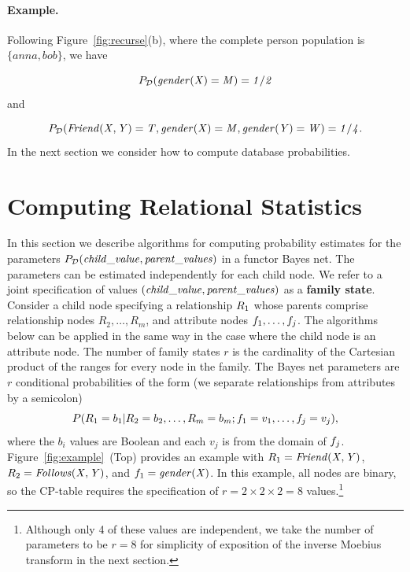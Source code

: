 \documentclass[oribibl]{llncs}
\begin{document}
\paragraph{Example.} Following Figure~\ref{fig:recurse}(b), where the complete person population is $\{anna,bob\}$, we have 

$$P_{\mathcal{D}}(\it{gender}(X) = M) = 1/2$$ and

$$P_{\mathcal{D}}(\it{Friend}(X,Y) = \mathit{T}, \it{gender}(X) = M, \it{gender}(Y) = W) = 1/4.$$ 
%
%
In the next section we consider how
to compute database probabilities.


\section{Computing Relational Statistics} \label{sec:mobius}

In this section we describe algorithms for computing  probability estimates for the parameters $P_{\mathcal{D}}(\it{child}\_value,\it{parent}\_\it{values})$ in a functor Bayes net. The parameters can be estimated independently for each child node. We refer to a joint specification of values $(\it{child}\_value,\it{parent}\_\it{values})$ as a \textbf{family state}. Consider a child node specifying a relationship $R_{1}$ whose parents comprise relationship nodes $R_{2},\ldots,R_{m}$, and attribute nodes $f_{1},\ldots,f_{j}$. The algorithms below can be applied in the same way in the case where the child node is an attribute node. The number of family states $r$ is the cardinality of the Cartesian product of the ranges for every node in the family.
 The Bayes net parameters are $r$ conditional probabilities of the form (we separate relationships from attributes by a semicolon)
\begin{equation} \label{eq:cond-prob}
P(R_{1} = b_{1}| R_{2} = b_{2},\ldots, R_{m} = b_{m}; f_{1} = v_{1},\ldots,f_{j} = v_{j}),
\end{equation}
where the $b_{i}$ values are Boolean and each $v_{j}$ is from the domain of $f_{j}$. 
Figure~\ref{fig:example}~(Top) provides an example with $R_{1} = \it{Friend}(X,Y)$, $R_{2} = \it{Follows}(X,Y)$, and $f_{1} = \it{gender}(X)$. In this example, all nodes are binary, so the CP-table requires the specification of $r= 2 \times 2 \times 2 = 8$ values.\footnote{Although only 4 of these values are independent, we take the number of parameters to be $r = 8$ for simplicity of exposition of the inverse Moebius transform in the next section.}
\end{document}
